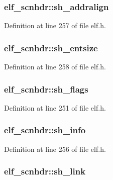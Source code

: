 \subsubsection[{sh\_\-addralign}]{ {\bf elf\_\-scnhdr::sh\_\-addralign}}\label{structelf__scnhdr_2bbf0719f5e577fd13f40b9562c7e9fc}




Definition at line 257 of file elf.h.
\subsubsection[{sh\_\-entsize}]{ {\bf elf\_\-scnhdr::sh\_\-entsize}}\label{structelf__scnhdr_309c8fdd6b01f1ec8f4970e3ea97ea1a}




Definition at line 258 of file elf.h.
\subsubsection[{sh\_\-flags}]{ {\bf elf\_\-scnhdr::sh\_\-flags}}\label{structelf__scnhdr_fd6add846edf378a05e8e777b41fe2c0}




Definition at line 251 of file elf.h.
\subsubsection[{sh\_\-info}]{ {\bf elf\_\-scnhdr::sh\_\-info}}\label{structelf__scnhdr_05fcb6f450e66a53ba75384284dd402b}




Definition at line 256 of file elf.h.
\subsubsection[{sh\_\-link}]{ {\bf elf\_\-scnhdr::sh\_\-link}}\label{structelf__scnhdr_7b16d694755907b6d1a415e0b7a89659}




